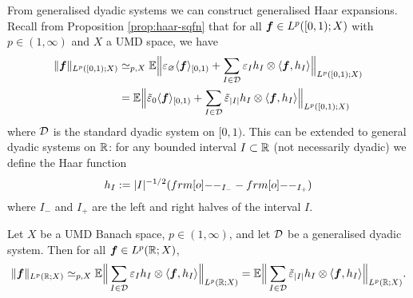 From generalised dyadic systems we can construct generalised Haar expansions.
Recall from Proposition \ref{prop:haar-sqfn} that for all $\bm{f} \in L^p([0,1);X)$ with $p \in (1,\infty)$ and $X$ a UMD space, we have 
  \begin{equation*}
    \begin{aligned}
    \|\bm{f}\|_{L^p([0,1);X)}
    &\simeq_{p,X} \mathbb{E} \Big\| \varepsilon_{\varnothing} \langle \bm{f} \rangle_{[0,1)} +  \sum_{I \in \mathcal{D}} \varepsilon_{I} h_{I} \otimes \langle \bm{f}, h_{I} \rangle \Big\|_{L^p([0,1);X)} \\
    &= \mathbb{E} \Big\| \tilde{\varepsilon}_{0} \langle \bm{f} \rangle_{[0,1)} + \sum_{I \in \mathcal{D}} \tilde{\varepsilon}_{|I|} h_{I} \otimes \langle \bm{f}, h_{I} \rangle \Big\|_{L^p([0,1);X)}
  \end{aligned}
\end{equation*}
where $\mathcal{D}$ is the standard dyadic system on $[0,1)$.
This can be extended to general dyadic systems on $\mathbb{R}$: for any bounded interval $I \subset \mathbb{R}$ (not necessarily dyadic) we define the Haar function
\begin{equation*}
  h_{I} := |I|^{-1/2}(\1_{I_{-}} - \1_{I_{+}})
\end{equation*}
where $I_{-}$ and $I_{+}$ are the left and right halves of the interval $I$.

\begin{thm}\label{thm:general-haar-decompositions}
  Let $X$ be a UMD Banach space, $p \in (1,\infty)$, and let $\mathcal{D}$ be a generalised dyadic system.
  Then for all $\bm{f} \in L^p(\mathbb{R};X)$,
  \begin{equation}\label{eq:gen-haar-sqfn}
      \|\bm{f}\|_{L^p(\mathbb{R};X)}
      \simeq_{p,X} \mathbb{E} \Big\| \sum_{I \in \mathcal{D}} \varepsilon_{I} h_{I} \otimes \langle \bm{f}, h_{I} \rangle \Big\|_{L^p(\mathbb{R};X)} 
      = \mathbb{E} \Big\| \sum_{I \in \mathcal{D}} \tilde{\varepsilon}_{|I|} h_{I} \otimes \langle \bm{f}, h_{I} \rangle \Big\|_{L^p(\mathbb{R};X)}.
    \end{equation}
\end{thm}

